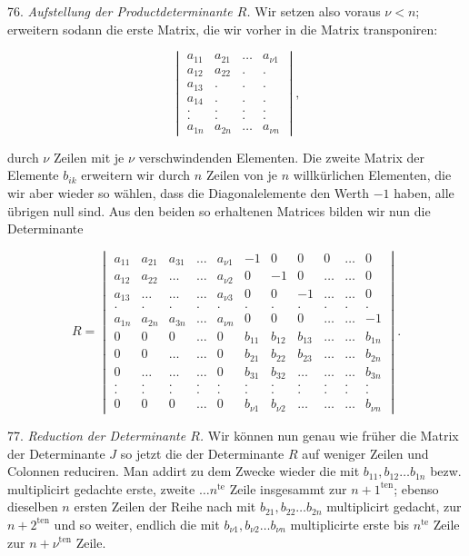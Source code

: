 76. \textit{Aufstellung der Productdeterminante $R$.} Wir setzen also voraus $\nu < n$; erweitern sodann die erste Matrix, die wir vorher in die Matrix transponiren:

\[
\begin{vmatrix}
a_{11} & a_{21} & \ldots & a_{\nu 1}\\
a_{12} & a_{22} & . & .\\
a_{13} & . & . & .\\
a_{14} & . & . & .\\
. & . & . & .\\
. & . & . & .\\
a_{1n} & a_{2n} & \ldots & a_{\nu n}
\end{vmatrix},
\]

durch $\nu$ Zeilen mit je $\nu$ verschwindenden Elementen. Die zweite Matrix der Elemente $b_{ik}$ erweitern wir durch $n$ Zeilen von je $n$ willkürlichen Elementen, die wir aber wieder so wählen, dass die Diagonalelemente den Werth $-1$ haben, alle übrigen null sind. Aus den beiden so erhaltenen Matrices bilden wir nun die Determinante

\[
R =
\begin{vmatrix}
a_{11} & a_{21} & a_{31} & \ldots & a_{\nu 1} & -1 & 0 & 0 & 0 & \ldots & 0\\
a_{12} & a_{22} & \ldots & \ldots & a_{\nu 2} & 0 & -1 & 0 & \ldots & \ldots & 0\\
a_{13} & \ldots & \ldots & \ldots & a_{\nu 3} & 0 & 0 & -1 & \ldots & \ldots & 0\\
. & . & . & . & . & . & . & . & . & . & .\\
a_{1n} & a_{2n} & a_{3n} & \ldots & a_{\nu n} & 0 & 0 & 0 & \ldots & \ldots & -1\\
0 & 0 & 0 & \ldots & 0 & b_{11} & b_{12} & b_{13} & \ldots & \ldots & b_{1n}\\
0 & 0 & \ldots & \ldots & 0 & b_{21} & b_{22} & b_{23} & \ldots & \ldots & b_{2n}\\
0 & \ldots & \ldots & \ldots & 0 & b_{31} & b_{32} & \ldots & \ldots & \ldots & b_{3n}\\
. & . & . & . & . & . & . & . & . & . & .\\
. & . & . & . & . & . & . & . & . & . & .\\
0 & 0 & 0 & \ldots & 0 & b_{\nu 1} & b_{\nu 2} & \ldots & \ldots & \ldots & b_{\nu n}
\end{vmatrix}.
\]

77. \textit{Reduction der Determinante $R$.} Wir können nun genau wie früher die Matrix der Determinante $J$ so jetzt die der Determinante $R$ auf weniger Zeilen und Colonnen reduciren. Man addirt zu dem Zwecke wieder die mit $b_{11}, b_{12} \ldots b_{1n}$ bezw. multiplicirt gedachte erste, zweite $\ldots n^{\mathrm{te}}$ Zeile insgesammt zur $n+1^{\mathrm{ten}}$; ebenso dieselben $n$ ersten Zeilen der Reihe nach mit $b_{21}, b_{22} \ldots b_{2n}$ multiplicirt gedacht, zur $n+2^{\mathrm{ten}}$ und so weiter, endlich die mit $b_{\nu 1}, b_{\nu 2} \ldots b_{\nu n}$ multiplicirte erste bis $n^{\mathrm{te}}$ Zeile zur $n+\nu^{\mathrm{ten}}$ Zeile.

